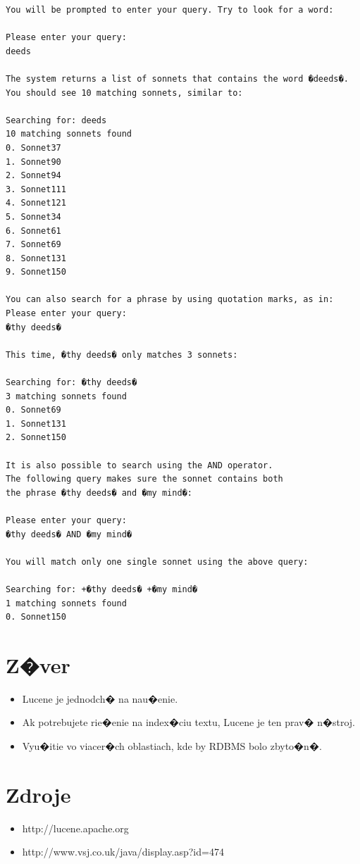 \documentclass[11pt,a4paper]{article}
\begin{document}
\begin{verbatim}
You will be prompted to enter your query. Try to look for a word: 

Please enter your query:
deeds

The system returns a list of sonnets that contains the word �deeds�. 
You should see 10 matching sonnets, similar to: 

Searching for: deeds
10 matching sonnets found
0. Sonnet37
1. Sonnet90
2. Sonnet94
3. Sonnet111
4. Sonnet121
5. Sonnet34
6. Sonnet61
7. Sonnet69
8. Sonnet131
9. Sonnet150

You can also search for a phrase by using quotation marks, as in: 
Please enter your query:
�thy deeds�

This time, �thy deeds� only matches 3 sonnets: 

Searching for: �thy deeds�
3 matching sonnets found
0. Sonnet69
1. Sonnet131
2. Sonnet150

It is also possible to search using the AND operator. 
The following query makes sure the sonnet contains both
the phrase �thy deeds� and �my mind�: 

Please enter your query:
�thy deeds� AND �my mind�

You will match only one single sonnet using the above query: 

Searching for: +�thy deeds� +�my mind�
1 matching sonnets found
0. Sonnet150
\end{verbatim}

\newpage

\section{Z�ver}

\begin{itemize}
\item Lucene je jednodch� na nau�enie.
\item Ak potrebujete rie�enie na index�ciu textu, Lucene je ten prav� n�stroj.
\item Vyu�itie vo viacer�ch oblastiach, kde by RDBMS bolo zbyto�n�.
\end{itemize}

\section{Zdroje}

\begin{itemize}
\item http://lucene.apache.org
\item http://www.vsj.co.uk/java/display.asp?id=474
\end{itemize}
\end{document}
